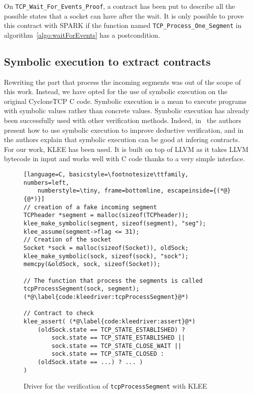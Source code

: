 \documentclass[conference]{IEEEtran}
\def\spark#1{\lstinline[language=Ada]{#1}}
\begin{document}
On \spark{TCP_Wait_For_Events_Proof}, a contract has been put to describe all
the possible states that a socket can have after the wait. It is only possible
to prove this contract with SPARK if the function named
\spark{TCP_Process_One_Segment} in algorithm~\ref{algo:waitForEvents}
has a postcondition.

\subsection{Symbolic execution to extract contracts}

Rewriting the part that process the incoming segments was out of the scope of
this work. Instead, we have opted for the use of symbolic execution on the
original CycloneTCP C code.
Symbolic execution is a mean to execute programs with symbolic values rather
than concrete values. Symbolic execution has already been successfully
used with other verification methods.
Indeed, in~\cite{vanoverberghe2008using} the authors present how to use symbolic
execution to improve deductive verification, and in~\cite{kassios2012comparing}
the authors explain that symbolic execution can be good at infering contracts.
For our work, KLEE has been used. It is built on top of LLVM as it takes LLVM
bytecode in input and works well with C code thanks to a very simple interface.

\begin{figure}
\begin{lstlisting}[language=C, basicstyle=\footnotesize\ttfamily, numbers=left,
    numberstyle=\tiny, frame=bottomline, escapeinside={(*@}{@*)}]
// creation of a fake incoming segment
TCPheader *segment = malloc(sizeof(TCPheader));
klee_make_symbolic(segment, sizeof(segment), "seg");
klee_assume(segment->flag <= 31);
// Creation of the socket
Socket *sock = malloc(sizeof(Socket)), oldSock;
klee_make_symbolic(sock, sizeof(sock), "sock");
memcpy(&oldSock, sock, sizeof(Socket));

// The function that process the segments is called
tcpProcessSegment(sock, segment); (*@\label{code:kleedriver:tcpProcessSegment}@*)

// Contract to check
klee_assert( (*@\label{code:kleedriver:assert}@*)
    (oldSock.state == TCP_STATE_ESTABLISHED) ?
        sock.state == TCP_STATE_ESTABLISHED ||
        sock.state == TCP_STATE_CLOSE_WAIT ||
        sock.state == TCP_STATE_CLOSED :
    (oldSock.state == ...) ? ... )
)
\end{lstlisting}
\caption{Driver for the verification of \lstinline[language=C]{tcpProcessSegment}
with KLEE}
\label{code:kleedriver}
\end{figure}
\end{document}
